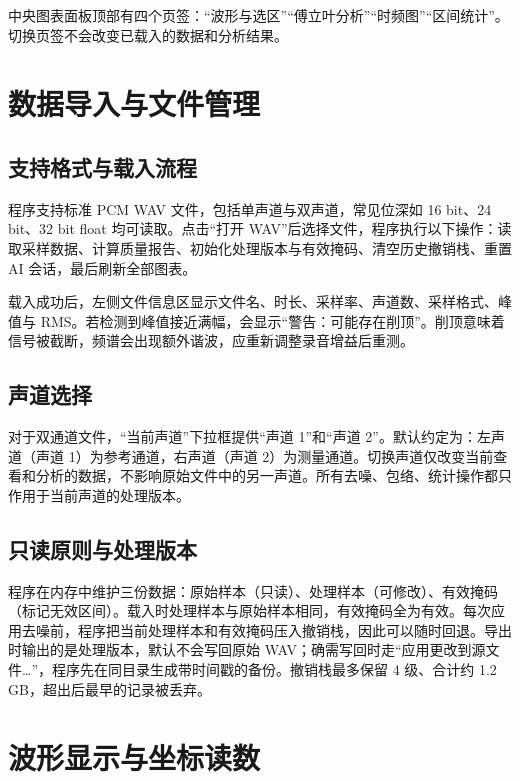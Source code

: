 \documentclass[UTF8,a4paper,12pt,scheme=chinese]{ctexart}
\begin{document}
中央图表面板顶部有四个页签：“波形与选区”“傅立叶分析”“时频图”“区间统计”。切换页签不会改变已载入的数据和分析结果。

\section{数据导入与文件管理}

\subsection{支持格式与载入流程}

程序支持标准 PCM WAV 文件，包括单声道与双声道，常见位深如 16 bit、24 bit、32 bit float 均可读取。点击“打开 WAV”后选择文件，程序执行以下操作：读取采样数据、计算质量报告、初始化处理版本与有效掩码、清空历史撤销栈、重置 AI 会话，最后刷新全部图表。

载入成功后，左侧文件信息区显示文件名、时长、采样率、声道数、采样格式、峰值与 RMS。若检测到峰值接近满幅，会显示“警告：可能存在削顶”。削顶意味着信号被截断，频谱会出现额外谐波，应重新调整录音增益后重测。

\subsection{声道选择}

对于双通道文件，“当前声道”下拉框提供“声道 1”和“声道 2”。默认约定为：左声道（声道 1）为参考通道，右声道（声道 2）为测量通道。切换声道仅改变当前查看和分析的数据，不影响原始文件中的另一声道。所有去噪、包络、统计操作都只作用于当前声道的处理版本。

\subsection{只读原则与处理版本}

程序在内存中维护三份数据：原始样本（只读）、处理样本（可修改）、有效掩码（标记无效区间）。载入时处理样本与原始样本相同，有效掩码全为有效。每次应用去噪前，程序把当前处理样本和有效掩码压入撤销栈，因此可以随时回退。导出时输出的是处理版本，默认不会写回原始 WAV；确需写回时走“应用更改到源文件…”，程序先在同目录生成带时间戳的备份。撤销栈最多保留 4 级、合计约 1.2\,GB，超出后最早的记录被丢弃。

\section{波形显示与坐标读数}
\end{document}

